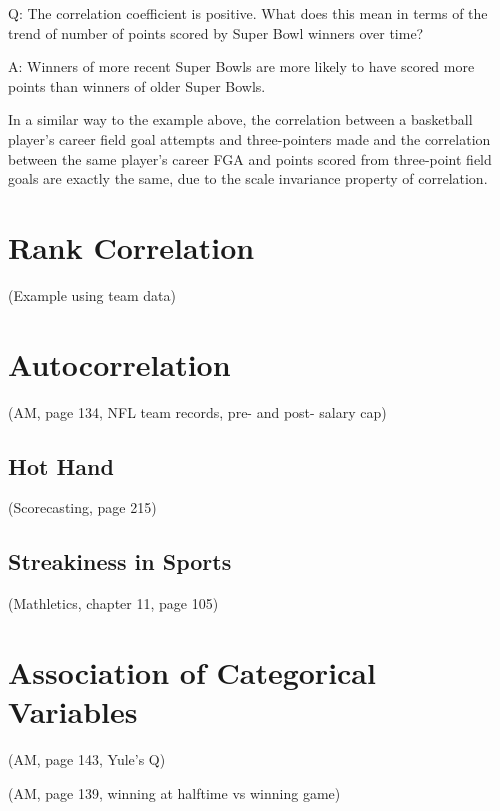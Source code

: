 \documentclass[
  11pt,
]{book}
\theoremstyle{definition}
\theoremstyle{definition}
\theoremstyle{definition}
\theoremstyle{definition}
\theoremstyle{remark}
\begin{document}
Q: The correlation coefficient is positive. What does this mean in terms of the trend of number of points scored by Super Bowl winners over time?

A: Winners of more recent Super Bowls are more likely to have scored more points than winners of older Super Bowls.

In a similar way to the example above, the correlation between a basketball player's career field goal attempts and three-pointers made and the correlation between the same player's career FGA and points scored from three-point field goals are exactly the same, due to the scale invariance property of correlation.

\hypertarget{rank-correlation}{%
\section{Rank Correlation}\label{rank-correlation}}

(Example using team data)

\hypertarget{autocorrelation}{%
\section{Autocorrelation}\label{autocorrelation}}

(AM, page 134, NFL team records, pre- and post- salary cap)

\hypertarget{hot-hand}{%
\subsection{Hot Hand}\label{hot-hand}}

(Scorecasting, page 215)

\hypertarget{streakiness-in-sports}{%
\subsection{Streakiness in Sports}\label{streakiness-in-sports}}

(Mathletics, chapter 11, page 105)

\hypertarget{association-of-categorical-variables}{%
\section{Association of Categorical Variables}\label{association-of-categorical-variables}}

(AM, page 143, Yule's Q)

(AM, page 139, winning at halftime vs winning game)
\end{document}
